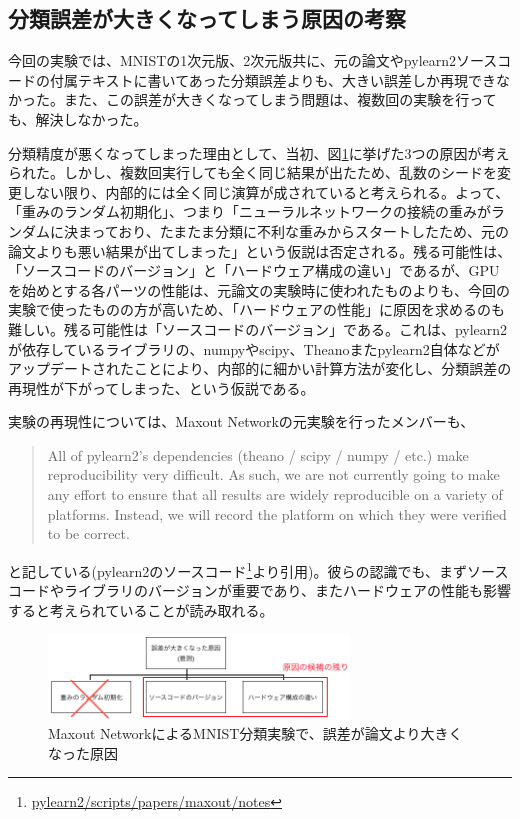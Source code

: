 \subsection{分類誤差が大きくなってしまう原因の考察}
今回の実験では、MNISTの1次元版、2次元版共に、元の論文やpylearn2ソースコードの付属テキストに書いてあった分類誤差よりも、大きい誤差しか再現できなかった。また、この誤差が大きくなってしまう問題は、複数回の実験を行っても、解決しなかった。\par
分類精度が悪くなってしまった理由として、当初、図\ref{c6_maxout_cause}に挙げた3つの原因が考えられた。しかし、複数回実行しても全く同じ結果が出たため、乱数のシードを変更しない限り、内部的には全く同じ演算が成されていると考えられる。よって、「重みのランダム初期化」、つまり「ニューラルネットワークの接続の重みがランダムに決まっており、たまたま分類に不利な重みからスタートしたため、元の論文よりも悪い結果が出てしまった」という仮説は否定される。残る可能性は、「ソースコードのバージョン」と「ハードウェア構成の違い」であるが、GPUを始めとする各パーツの性能は、元論文の実験時に使われたものよりも、今回の実験で使ったものの方が高いため、「ハードウェアの性能」に原因を求めるのも難しい。残る可能性は「ソースコードのバージョン」である。これは、pylearn2が依存しているライブラリの、numpyやscipy、Theanoまたpylearn2自体などがアップデートされたことにより、内部的に細かい計算方法が変化し、分類誤差の再現性が下がってしまった、という仮説である。\par
実験の再現性については、Maxout Networkの元実験を行ったメンバーも、
\begin{quote}
All of pylearn2's dependencies (theano / scipy / numpy / etc.) make reproducibility
very difficult. As such, we are not currently going to make any effort to ensure that
all results are widely reproducible on a variety of platforms. Instead, we will
record the platform on which they were verified to be correct.
\end{quote}
と記している(pylearn2のソースコード\footnote{\url{pylearn2/scripts/papers/maxout/notes}}より引用)。彼らの認識でも、まずソースコードやライブラリのバージョンが重要であり、またハードウェアの性能も影響すると考えられていることが読み取れる。\\
\begin{figure}[tbp]
 \begin{center}
  \includegraphics[width=80mm]{img/c6/maxout_error_cause}
 \end{center}
 \caption{Maxout NetworkによるMNIST分類実験で、誤差が論文より大きくなった原因}
 \label{c6_maxout_cause}
\end{figure}
